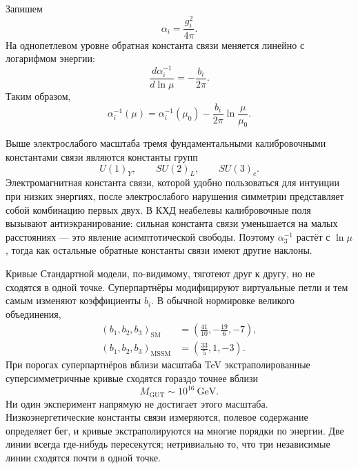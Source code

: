 Запишем
\begin{equation}
\alpha_i=\frac{g_i^2}{4\pi}.
\end{equation}
На однопетлевом уровне обратная константа связи меняется линейно с логарифмом энергии:
\begin{equation}
\frac{d\alpha_i^{-1}}{d\ln\mu}
=-\frac{b_i}{2\pi}.
\end{equation}
Таким образом,
\begin{equation}
\alpha_i^{-1}(\mu)
=\alpha_i^{-1}(\mu_0)
-\frac{b_i}{2\pi}\ln\frac{\mu}{\mu_0}.
\end{equation}

Выше электрослабого масштаба тремя фундаментальными калибровочными константами связи являются константы групп
\begin{equation}
U(1)_Y,\qquad SU(2)_L,\qquad SU(3)_c.
\end{equation}
Электромагнитная константа связи, которой удобно пользоваться для интуиции при низких энергиях, после электрослабого нарушения симметрии представляет собой комбинацию первых двух. В КХД неабелевы калибровочные поля вызывают антиэкранирование: сильная константа связи уменьшается на малых расстояниях — это явление асимптотической свободы. Поэтому \(\alpha_3^{-1}\) растёт с \(\ln\mu\), тогда как остальные обратные константы связи имеют другие наклоны.

Кривые Стандартной модели, по-видимому, тяготеют друг к другу, но не сходятся в одной точке. Суперпартнёры модифицируют виртуальные петли и тем самым изменяют коэффициенты \(b_i\). В обычной нормировке великого объединения,
\begin{align}
(b_1,b_2,b_3)_{\mathrm{SM}}
&=\left(\frac{41}{10},-\frac{19}{6},-7\right),\\
(b_1,b_2,b_3)_{\mathrm{MSSM}}
&=\left(\frac{33}{5},1,-3\right).
\end{align}
При порогах суперпартнёров вблизи масштаба TeV экстраполированные суперсимметричные кривые сходятся гораздо точнее вблизи
\begin{equation}
M_{\mathrm{GUT}}\sim 10^{16}\ \mathrm{GeV}.
\end{equation}
Ни один эксперимент напрямую не достигает этого масштаба. Низкоэнергетические константы связи измеряются, полевое содержание определяет бег, и кривые экстраполируются на многие порядки по энергии. Две линии всегда где-нибудь пересекутся; нетривиально то, что три независимые линии сходятся почти в одной точке.


